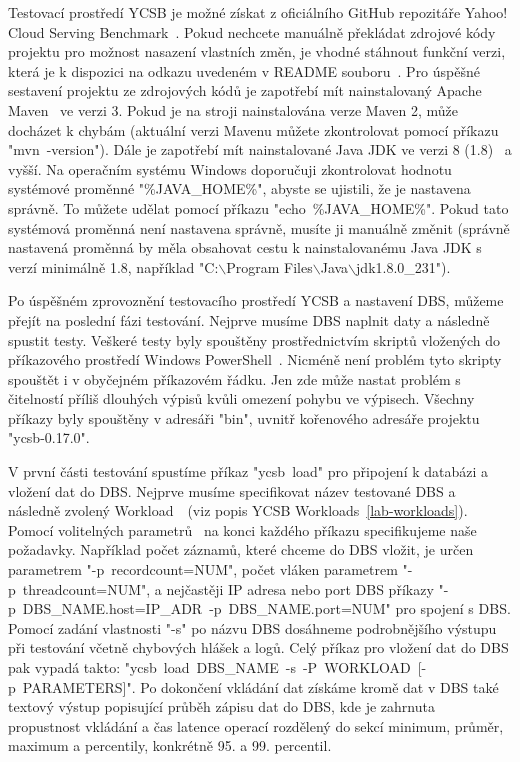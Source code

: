\documentclass[czech,master,dept460,male,csharp,cpdeclaration]{diploma}
\begin{document}
	Testovací prostředí YCSB je možné získat z oficiálního GitHub repozitáře Yahoo! Cloud Serving Benchmark~\cite{ycsb}. Pokud nechcete manuálně překládat zdrojové kódy projektu pro možnost nasazení vlastních změn, je vhodné stáhnout funkční verzi, která je k dispozici na odkazu uvedeném v README souboru~\cite{ycsb-download}. Pro úspěšné sestavení projektu ze zdrojových kódů je zapotřebí mít nainstalovaný Apache Maven~\cite{maven} ve verzi 3. Pokud je na stroji nainstalována verze Maven 2, může docházet k chybám (aktuální verzi Mavenu můžete zkontrolovat pomocí příkazu "mvn~-version"). Dále je zapotřebí mít nainstalované Java JDK ve verzi 8 (1.8)~\cite{java-jdk} a vyšší. Na operačním systému Windows doporučuji zkontrolovat hodnotu systémové proměnné "\%JAVA\_HOME\%", abyste se ujistili, že je nastavena správně. To můžete udělat pomocí příkazu "echo~\%JAVA\_HOME\%". Pokud tato systémová proměnná není nastavena správně, musíte ji manuálně změnit (správně nastavená proměnná by měla obsahovat cestu k nainstalovanému Java JDK s verzí minimálně 1.8, například  "C:$\backslash$Program Files$\backslash$Java$\backslash$jdk1.8.0\_231").
	
	Po úspěšném zprovoznění testovacího prostředí YCSB a nastavení DBS, můžeme přejít na poslední fázi testování. Nejprve musíme DBS naplnit daty a následně spustit testy. Veškeré testy byly spouštěny prostřednictvím skriptů vložených do příkazového prostředí Windows PowerShell~\cite{win-powershell}. Nicméně není problém tyto skripty spouštět i v obyčejném příkazovém řádku. Jen zde může nastat problém s čitelností příliš dlouhých výpisů kvůli omezení pohybu ve výpisech. Všechny příkazy byly spouštěny v adresáři "bin", uvnitř kořenového adresáře projektu "ycsb-0.17.0".
	
	V první části testování spustíme příkaz "ycsb~load" pro připojení k databázi a vložení dat do DBS. Nejprve musíme specifikovat název testované DBS a následně zvolený Workload~\cite{workloads}~(viz popis YCSB Workloads~\ref{lab-workloads}). Pomocí volitelných parametrů~\cite{ycsb-properties} na konci každého příkazu specifikujeme naše požadavky. Například počet záznamů, které chceme do DBS vložit, je určen parametrem "-p~recordcount=NUM", počet vláken parametrem "-p~threadcount=NUM", a nejčastěji IP adresa nebo port DBS příkazy "-p~DBS\_NAME.host=IP\_ADR~-p~DBS\_NAME.port=NUM" pro spojení s DBS. Pomocí zadání vlastnosti "-s" po názvu DBS dosáhneme podrobnějšího výstupu při testování včetně chybových hlášek a logů. Celý příkaz pro vložení dat do DBS pak vypadá takto: "ycsb~load~DBS\_NAME~-s~-P~WORKLOAD~[-p~PARAMETERS]". Po dokončení vkládání dat získáme kromě dat v DBS také textový výstup popisující průběh zápisu dat do DBS, kde je zahrnuta propustnost vkládání a čas latence operací rozdělený do sekcí minimum, průměr, maximum a percentily, konkrétně 95. a 99. percentil.
	
\end{document}
